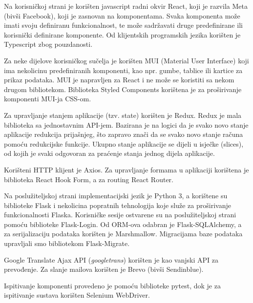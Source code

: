                 \par    Na korisničkoj strani je korišten javascript radni okvir React, koji je razvila Meta (bivši Facebook), koji je 
                zasnovan na komponentama. Svaka komponenta može imati svoju definiranu funkcionalnost, te može sadržavati druge predefinirane 
                ili korisnički definirane komponente. Od klijentskih programskih jezika korišten je Typescript zbog pouzdanosti.

                \par    Za neke dijelove korisničkog sučelja je korišten MUI (Material User Interface) koji ima nekolicinu predefiniranih
                komponenti, kao npr. gumbe, tablice ili kartice za prikaz podataka. MUI je napravljen za React i ne može se koristiti
                sa nekom drugom bibliotekom. Biblioteka Styled Components korištena je za proširivanje komponenti MUI-ja CSS-om.

                \par    Za upravljanje stanjem aplikacije (tzv. state) korišten je Redux. Redux je mala biblioteka sa jednostavnim API-jem.
                Bazirana je na logici da je svako novo stanje aplikacije redukcija prijašnjeg, što zapravo znači da se
                svako novo stanje računa pomoću redukcijske funkcije. Ukupno stanje aplikacije se 
                dijeli u isječke (slices), od kojih je svaki odgovoran za praćenje stanja jednog dijela aplikacije.

                \par   Korišteni HTTP klijent je Axios. Za upravljanje formama u aplikaciji korištena je biblioteka React Hook Form, a za routing React Router.

                \par    Na poslužiteljskoj strani implementacijski jezik je Python 3, a korištene su biblioteke Flask i nekolicina popratnih
                tehnologija koje služe za proširivanje funkcionalnosti Flaska. Korisničke sesije ostvarene su na poslužiteljskoj strani pomoću biblioteke Flask-Login. Od ORM-ova odabran je Flask-SQLAlchemy, a za serijalizaciju podataka korišten je Marshmallow. Migracijama baze podataka upravljali smo bibliotekom Flask-Migrate.

                \par Google Translate Ajax API (\emph{googletrans}) korišten je kao vanjski API za prevođenje. Za slanje mailova korišten je Brevo (bivši Sendinblue).

                \par    Ispitivanje komponenti provedeno je pomoću biblioteke pytest, dok je za ispitivanje sustava korišten Selenium WebDriver.

